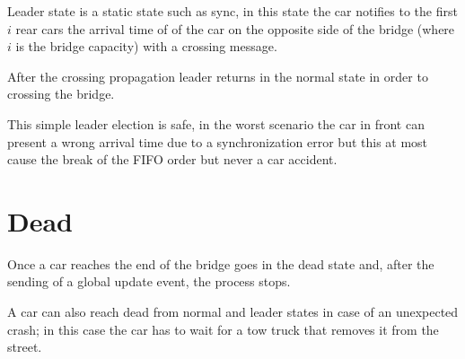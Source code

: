 Leader state is a static state such as sync, in this state the car notifies to 
the first $i$ rear cars the arrival time of of the car on the opposite side of the bridge 
(where $i$ is the bridge capacity) with a crossing message.

After the crossing propagation leader returns in the normal state in order to 
crossing the bridge. 

This simple leader election is safe, in the worst scenario 
the car in front can present a wrong arrival time due to a synchronization error 
but this at most cause the break of the FIFO order but never a car accident.


\section{Dead}

Once a car reaches the end of the bridge goes in the dead state and, 
after the sending of a global update event, the process stops.

A car can also reach dead from normal and leader states in case of an unexpected 
crash; in this case the car has to wait for a tow truck that removes it from the 
street. 